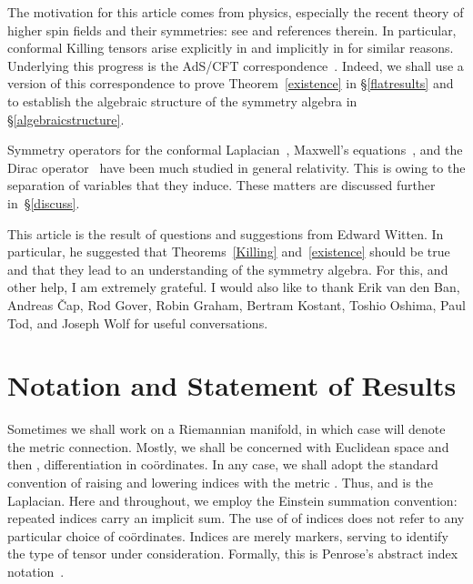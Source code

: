 \documentclass[a4paper,12pt]{amsart}
\begin{document}
The motivation for this article comes from physics, especially the recent
theory of higher spin fields and their symmetries: see \cite{mik,ss,v} and
references therein. In particular, conformal Killing tensors arise explicitly
in \cite{mik} and implicitly in \cite{v} for similar reasons. Underlying this
progress is the AdS/CFT correspondence~\cite{gr,ma,wi}. Indeed, we shall use a
version of this correspondence to prove Theorem~\ref{existence} in
\S\ref{flatresults} and to establish the algebraic structure of the symmetry
algebra in \S\ref{algebraicstructure}.

Symmetry operators for the conformal Laplacian~\cite{km}, Maxwell's
equations~\cite{kmw}, and the Dirac operator~\cite{msw} have been much studied
in general relativity. This is owing to the separation of variables that they
induce. These matters are
discussed further in~\S\ref{discuss}.

This article is the result of questions and suggestions from Edward Witten. In
particular, he suggested that Theorems~\ref{Killing} and~\ref{existence} should
be true and that they lead to an understanding of the symmetry algebra. For
this, and other help, I am extremely grateful. I would also like to thank Erik
van den Ban, Andreas \v{C}ap, Rod Gover, Robin Graham, Bertram Kostant, Toshio
Oshima, Paul Tod, and Joseph Wolf for useful conversations.

\section{Notation and Statement of Results}\label{statement}
Sometimes we shall work on a Riemannian manifold, in which case \coordHE{} will
denote the metric connection. Mostly, we shall be concerned with Euclidean
space \coordHE{} and then \coordHE{},
differentiation in co\"ordinates. In any case, we shall adopt the standard
convention of raising and lowering indices with the metric \coordHE{}. Thus,
\coordHE{} and \coordHE{} is the Laplacian. Here
and throughout, we employ the Einstein summation convention: repeated indices
carry an implicit sum. The use of of indices does not refer to any particular
choice of co\"ordinates. Indices are merely markers, serving to identify the
type of tensor under consideration. Formally, this is Penrose's abstract index
notation~\cite{OT}.
\end{document}
